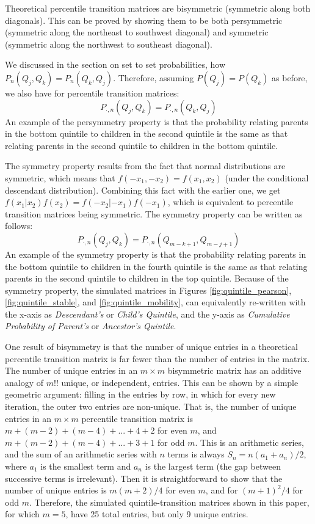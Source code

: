 \documentclass[a4paper,11pt]{article} %
\begin{document}
Theoretical percentile transition matrices are bisymmetric (symmetric along both diagonals). This can be proved by showing them to be both persymmetric (symmetric along the northeast to southwest diagonal) and symmetric (symmetric along the northwest to southeast diagonal). 

We discussed in the section on set to set probabilities, how $P_n(Q_j, Q_k) = P_n(Q_k, Q_j)$. Therefore, assuming  $P(Q_j) = P(Q_k)$ as before, we also have for percentile transition matrices: 
$$P_{ \cdot, n}(Q_j, Q_k) = P_{\cdot, n}(Q_k, Q_j)$$
An example of the persymmetry property is that the probability relating parents in the bottom quintile to children in the second quintile is the same as that relating parents in the second quintile to children in the bottom quintile.

The symmetry property results from the fact that normal distributions are symmetric, which means that $f(-x_1,-x_2) = f(x_1,x_2)$ (under the conditional descendant distribution). Combining this fact with the earlier one, we get $f(x_1|x_2)f(x_2) = f(-x_2|-x_1)f(-x_1)$, which is equivalent to percentile transition matrices being symmetric. The symmetry property can be written as follows:
$$P_{ \cdot, n}(Q_j, Q_k) = P_{\cdot, n}(Q_{m-k+1}, Q_{m-j+1})$$
An example of the symmetry property is that the probability relating parents in the bottom quintile to children in the fourth quintile is the same as that relating parents in the second quintile to children in the top quintile. Because of the symmetry property, the simulated matrices in Figures \ref{fig:quintile_pearson}, \ref{fig:quintile_stable}, and \ref{fig:quintile_mobility}, can equivalently re-written with the x-axis as \emph{Descendant's} or \emph{Child's Quintile}, and the y-axis as \emph{Cumulative Probability of Parent's} or \emph{Ancestor's Quintile}. 

One result of bisymmetry is that the number of unique entries in a theoretical percentile transition matrix is far fewer than the number of entries in the matrix. The number of unique entries in an $m \times m$ bisymmetric matrix has an additive analogy of $m!!$ unique, or independent, entries. This can be shown by a simple geometric argument: filling in the entries by row, in which for every new iteration, the outer two entries are non-unique. That is, the number of unique entries in an $m \times m$ percentile transition matrix is $m + (m-2) + (m-4) + ... + 4 + 2$ for even $m$, and $m + (m-2) + (m-4) + ... + 3 + 1$ for odd $m$. This is an arithmetic series, and the sum of an arithmetic series with $n$ terms is always $S_n = n(a_1 + a_n) /2$, where $a_1$ is the smallest term and $a_n$ is the largest term (the gap between successive terms is irrelevant). Then it is straightforward to show that the number of unique entries is $m(m+2)/4$ for even $m$, and for $(m+1)^2/4$ for odd $m$. Therefore, the simulated quintile-transition matrices shown in this paper, for which $m = 5$, have 25 total entries, but only 9 unique entries.
\end{document}
